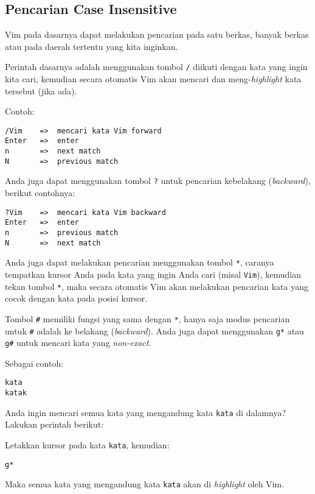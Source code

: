 \documentclass{article}
\begin{document}
\subsection{Pencarian Case Insensitive}

Vim pada dasarnya dapat melakukan pencarian pada satu
berkas, banyak berkas atau pada daerah tertentu yang kita
inginkan.

Perintah dasarnya adalah menggunakan tombol \verb=/= diikuti
dengan kata yang ingin kita cari, kemudian secara otomatis
Vim akan mencari dan meng-\emph{highlight} kata tersebut
(jika ada).

Contoh:

\begin{verbatim}
/Vim    =>  mencari kata Vim forward
Enter   =>  enter
n       =>  next match
N       =>  previous match
\end{verbatim}

Anda juga dapat menggunakan tombol \verb=?= untuk pencarian
kebelakang (\emph{backward}), berikut contohnya:

\begin{verbatim}
?Vim    =>  mencari kata Vim backward
Enter   =>  enter
n       =>  previous match
N       =>  next match
\end{verbatim}

Anda juga dapat melakukan pencarian menggunakan tombol
\verb=*=, caranya tempatkan kursor Anda pada kata yang ingin
Anda cari (misal \verb=Vim=), kemudian tekan tombol
\verb=*=, maka secara otomatis Vim akan melakukan pencarian
kata yang cocok dengan kata pada posisi kursor.

Tombol \verb=#= memiliki fungsi yang sama dengan \verb=*=,
hanya saja modus pencarian untuk \verb=#= adalah ke belakang
(\emph{backward}). Anda juga dapat menggunakan \verb=g*=
atau \verb=g#= untuk mencari kata yang \emph{non-exact}.

Sebagai contoh:

\begin{verbatim}
kata
katak
\end{verbatim}

Anda ingin mencari semua kata yang mengandung kata
\verb=kata= di dalamnya? Lakukan perintah berikut:

Letakkan kursor pada kata \verb=kata=, kemudian:

\begin{verbatim}
g*
\end{verbatim}

Maka semua kata yang mengandung kata \verb=kata= akan di
\emph{highlight} oleh Vim.
\end{document}
